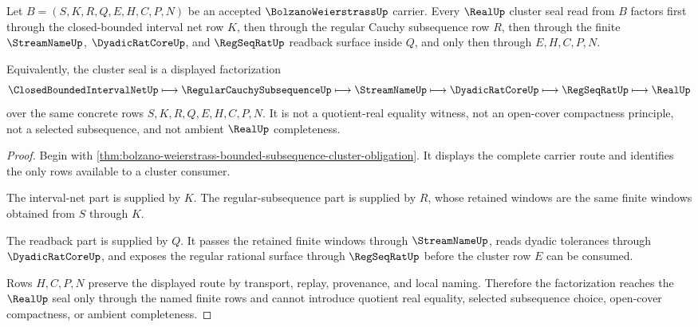 \begin{theorem}
\label{thm:bolzano-weierstrass-cluster-real-seal-factorization}
Let $B=(S,K,R,Q,E,H,C,P,N)$ be an accepted $\BolzanoWeierstrassUp$ carrier. Every $\RealUp$ cluster seal read from $B$ factors first through the closed-bounded interval net row $K$, then through the regular Cauchy subsequence row $R$, then through the finite $\StreamNameUp$, $\DyadicRatCoreUp$, and $\RegSeqRatUp$ readback surface inside $Q$, and only then through $E,H,C,P,N$.

Equivalently, the cluster seal is a displayed factorization
$$
\ClosedBoundedIntervalNetUp \longmapsto \RegularCauchySubsequenceUp \longmapsto \StreamNameUp \longmapsto \DyadicRatCoreUp \longmapsto \RegSeqRatUp \longmapsto \RealUp
$$
over the same concrete rows $S,K,R,Q,E,H,C,P,N$. It is not a quotient-real equality witness, not an open-cover compactness principle, not a selected subsequence, and not ambient $\RealUp$ completeness.
\end{theorem}
\begin{proof}
Begin with \autoref{thm:bolzano-weierstrass-bounded-subsequence-cluster-obligation}. It displays the complete carrier route and identifies the only rows available to a cluster consumer.

The interval-net part is supplied by $K$. The regular-subsequence part is supplied by $R$, whose retained windows are the same finite windows obtained from $S$ through $K$.

The readback part is supplied by $Q$. It passes the retained finite windows through $\StreamNameUp$, reads dyadic tolerances through $\DyadicRatCoreUp$, and exposes the regular rational surface through $\RegSeqRatUp$ before the cluster row $E$ can be consumed.

Rows $H,C,P,N$ preserve the displayed route by transport, replay, provenance, and local naming. Therefore the factorization reaches the $\RealUp$ seal only through the named finite rows and cannot introduce quotient real equality, selected subsequence choice, open-cover compactness, or ambient completeness.
\end{proof}

